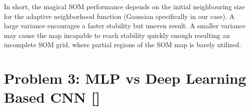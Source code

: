 \documentclass{tron}
\begin{document}
In short, the magical SOM performance depends on the initial neighbouring size for the adaptive neighborhood function (Gaussian specifically in our case). A large variance encourages a faster stability but uneven result. A smaller variance may cause the map incapable to reach stability quickly enough resulting an incomplete SOM grid, where partial regions of the SOM map is barely utilized. 



\newpage
\section{Problem 3: MLP vs Deep Learning Based CNN []}

%	
%	

%	
%		
%	
%	
%		
%		
%		
%		
%	
%	
%		
%		
%		
%		
%		
%		
%		
%		
%		
\end{document}
